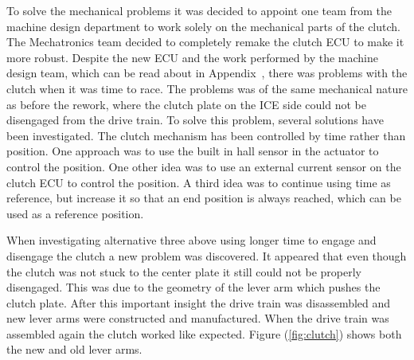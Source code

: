 To solve the mechanical problems it was decided to appoint one team from the
machine design department to work solely on the mechanical parts of the clutch.
The Mechatronics team decided to completely remake the clutch ECU to make it
more robust. Despite the new ECU and the work performed by the machine design
team, which can be read about in Appendix~\cite{MD_report}, there was problems
with the clutch when it was time to race. The problems was of the same
mechanical nature as before the rework, where the clutch plate on the ICE side
could not be disengaged from the drive train. To solve this problem, several
solutions have been investigated. The clutch mechanism has been controlled by
time rather than position. One approach was to use the built in hall sensor in
the actuator to control the position. One other idea was to use an external
current sensor on the clutch ECU to control the position. A third idea was to
continue using time as reference, but increase it so that an end position is
always reached, which can be used as a reference position.

When investigating alternative three above using longer time to engage and
disengage the clutch a new problem was discovered. It appeared that even though
the clutch was not stuck to the center plate it still could not be properly
disengaged. This was due to the geometry of the lever arm which pushes the
clutch plate.  After this important insight the drive train was disassembled and
new lever arms were constructed and manufactured. When the drive train was
assembled again the clutch worked like expected. Figure (\ref{fig:clutch}) shows both the new and old lever arms.

